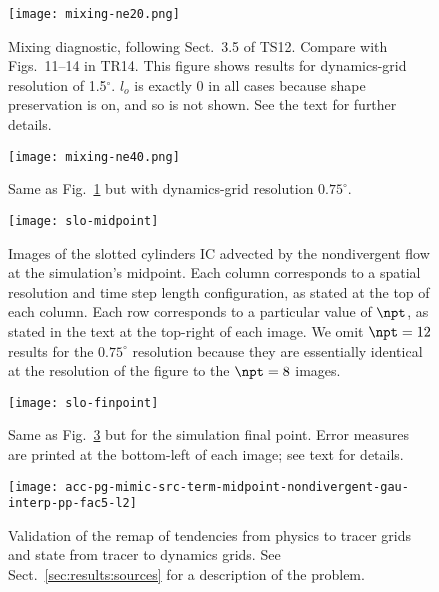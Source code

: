 \begin{figure}[tbh]
  \centering
  \texttt{[image: mixing-ne20.png]}
  \caption{
    Mixing diagnostic, following Sect.~3.5 of TS12.
    Compare with Figs.~11--14 in TR14.
    This figure shows results for dynamics-grid resolution of 1.5$^\circ$.
    $l_o$ is exactly 0 in all cases because shape preservation is on, and so is not shown.
    See the text for further details.}
  \label{fig:mixing-ne20}
\end{figure}
\begin{figure}[tbh]
  \centering
  \texttt{[image: mixing-ne40.png]}
  \caption{Same as Fig.~\ref{fig:mixing-ne20} but with dynamics-grid resolution $0.75^\circ$.}
  \label{fig:mixing-ne40}
\end{figure}

\begin{figure}[tbh]
  \centering
  \texttt{[image: slo-midpoint]}
  \caption{
    Images of the slotted cylinders IC advected by the nondivergent flow at the simulation's midpoint.
    Each column corresponds to a spatial resolution and time step length configuration,
    as stated at the top of each column.
    Each row corresponds to a particular value of $\npt$, as stated in the text at the top-right of each image.
    We omit $\npt=12$ results for the $0.75^\circ$ resolution because they are essentially identical at the resolution of the figure to the $\npt=8$ images.
  }
  \label{fig:slocyl-midpoint}
\end{figure}
\begin{figure}[tbh]
  \centering
  \texttt{[image: slo-finpoint]}
  \caption{
    Same as Fig.~\ref{fig:slocyl-midpoint} but for the simulation final point.
    Error measures are printed at the bottom-left of each image; see text for details.
  }
  \label{fig:slocyl-finpoint}
\end{figure}

\begin{figure}[tbh]
  \centering
  \texttt{[image: acc-pg-mimic-src-term-midpoint-nondivergent-gau-interp-pp-fac5-l2]}
  \caption{
    Validation of the remap of tendencies from physics to tracer grids and state from tracer to dynamics grids.
    See Sect.~\ref{sec:results:sources} for a description of the problem.
  }
  \label{fig:pg-mimic-src-term}
\end{figure}

